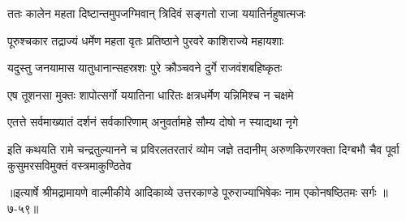 \twolineshloka
{ततः कालेन महता दिष्टान्तमुपजग्मिवान्}
{त्रिदिवं सङ्गतो राजा ययातिर्नहुषात्मजः} %

\twolineshloka
{पूरुश्चकार तद्राज्यं धर्मेण महता वृतः}
{प्रतिष्ठाने पुरवरे काशिराज्ये महायशाः} %

\twolineshloka
{यदुस्तु जनयामास यातुधानान्सहस्रशः}
{पुरे क्रौञ्चवने दुर्गे राजवंशबहिष्कृतः} %

\twolineshloka
{एष तूशनसा मुक्तः शापोत्सर्गो ययातिना}
{धारितः क्षत्रधर्मेण यन्निमिश्च न चक्षमे} %

\twolineshloka
{एतत्ते सर्वमाख्यातं दर्शनं सर्वकारिणाम्}
{अनुवर्तामहे सौम्य दोषो न स्याद्यथा नृगे} %

\twolineshloka
{इति कथयति रामे चन्द्रतुल्यानने च प्रविरलतरतारं व्योम जज्ञे तदानीम्}
{अरुणकिरणरक्ता दिग्बभौ चैव पूर्वा कुसुमरसविमुक्तं वस्त्रमाकुण्ठितेव} %


॥इत्यार्षे श्रीमद्रामायणे वाल्मीकीये आदिकाव्ये उत्तरकाण्डे पूरुराज्याभिषेकः नाम एकोनषष्ठितमः सर्गः ॥७-५९॥
